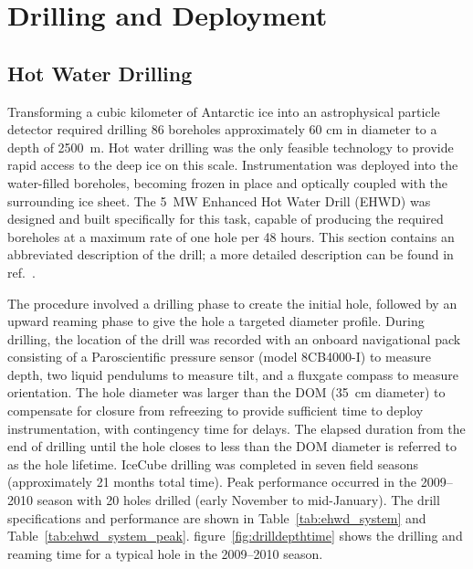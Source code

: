 
\section{\label{sec:drill-deploy}Drilling and Deployment}

\subsection{\label{sec:hot_water_drilling}Hot Water Drilling}

Transforming a cubic kilometer of Antarctic ice into an astrophysical
particle detector required drilling 86 boreholes
approximately 60 cm in diameter to a depth of 2500~m. Hot water drilling
was the only
feasible technology to provide rapid access to the deep ice on this scale.
Instrumentation was deployed into the water-filled boreholes, becoming
frozen in place and optically
coupled with the surrounding ice sheet. The 5~MW Enhanced Hot Water Drill
(EHWD) was designed and built specifically for this task,
capable of producing the required boreholes at a maximum rate of one hole per 48
hours. This section contains an abbreviated description of the drill; a more detailed description
can be found in ref.~\cite{ehwd}.

The procedure involved a drilling phase to create the initial hole,
followed by an upward reaming phase to give the 
hole a targeted diameter profile.  During drilling, the location of
the drill was recorded with an onboard navigational pack consisting of
a Paroscientific pressure sensor
(model 8CB4000-I) to measure depth, two
liquid pendulums to measure tilt, and a fluxgate compass to measure
orientation. The hole diameter was larger than
the DOM (35~cm diameter) to compensate for closure from refreezing to provide sufficient
time to deploy instrumentation, with contingency time for delays.  The
elapsed duration from the end of drilling until the hole closes to
less than the DOM diameter is referred to as the hole lifetime. IceCube drilling was
completed in seven field seasons (approximately 21 months total time).
Peak performance occurred in the 2009--2010 season with 20 holes drilled
(early November to mid-January).  The drill specifications and performance
are shown in Table~\ref{tab:ehwd_system} and
Table~\ref{tab:ehwd_system_peak}. figure~\ref{fig:drilldepthtime} shows the
drilling and reaming time for a typical hole in the 2009--2010 season.

